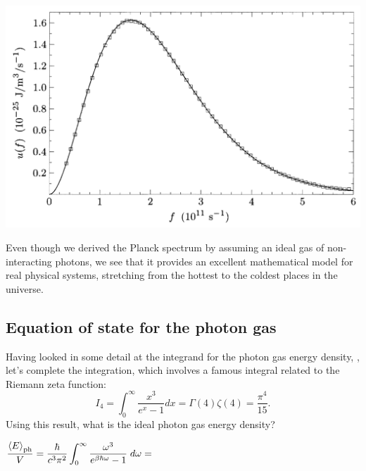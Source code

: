 \begin{center}\includegraphics[width=\textwidth]{figs/unit08_COBE.pdf}\end{center}

\begin{shaded}
  Even though we derived the Planck spectrum by assuming an ideal gas of non-interacting photons, we see that it provides an excellent mathematical model for real physical systems, stretching from the hottest to the coldest places in the universe.
\end{shaded}



\subsection{\label{sec:photon_eos}Equation of state for the photon gas}
Having looked in some detail at the integrand for the photon gas energy density, , let's complete the integration, which involves a famous integral related to the Riemann zeta function:
\begin{equation*}
  I_4 = \int_0^{\infty} \frac{x^3}{e^x - 1} dx = \Gamma(4) \zeta(4) = \frac{\pi^4}{15}.
\end{equation*}
Using this result, what is the ideal photon gas energy density?
\begin{mdframed}
  $\displaystyle \frac{\left\langle E \right\rangle_{\text{ph}}}{V} = \frac{\hbar}{c^3 \pi^2} \int_0^{\infty} \frac{\omega^3}{e^{\beta \hbar \omega} - 1} \; d\omega = $ \\[100 pt]
\end{mdframed}

